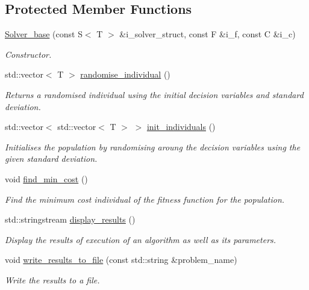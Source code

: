 \subsection*{Protected Member Functions}
\begin{DoxyCompactItemize}
\item 
\hyperlink{classea_1_1_solver__base_a3d0f28385218d7d869f3217adddcf93f}{Solver\+\_\+base} (const S$<$ T $>$ \&i\+\_\+solver\+\_\+struct, const F \&i\+\_\+f, const C \&i\+\_\+c)
\begin{DoxyCompactList}\small\item\em Constructor. \end{DoxyCompactList}\item 
std\+::vector$<$ T $>$ \hyperlink{classea_1_1_solver__base_a865cea7e218b633b440b88fa09e48466}{randomise\+\_\+individual} ()
\begin{DoxyCompactList}\small\item\em Returns a randomised individual using the initial decision variables and standard deviation. \end{DoxyCompactList}\item 
std\+::vector$<$ std\+::vector$<$ T $>$ $>$ \hyperlink{classea_1_1_solver__base_a3220df901d0e61d3c49e6265640d94ae}{init\+\_\+individuals} ()
\begin{DoxyCompactList}\small\item\em Initialises the population by randomising aroung the decision variables using the given standard deviation. \end{DoxyCompactList}\item 
void \hyperlink{classea_1_1_solver__base_ac69a6c714298054039acbbbf5d2eea23}{find\+\_\+min\+\_\+cost} ()
\begin{DoxyCompactList}\small\item\em Find the minimum cost individual of the fitness function for the population. \end{DoxyCompactList}\item 
std\+::stringstream \hyperlink{classea_1_1_solver__base_ae16049f3e8586c144165fa2916ccdbce}{display\+\_\+results} ()
\begin{DoxyCompactList}\small\item\em Display the results of execution of an algorithm as well as its parameters. \end{DoxyCompactList}\item 
void \hyperlink{classea_1_1_solver__base_a20dd7b75350cd42e13ecdc6c5714010a}{write\+\_\+results\+\_\+to\+\_\+file} (const std\+::string \&problem\+\_\+name)
\begin{DoxyCompactList}\small\item\em Write the results to a file. \end{DoxyCompactList}\end{DoxyCompactItemize}
